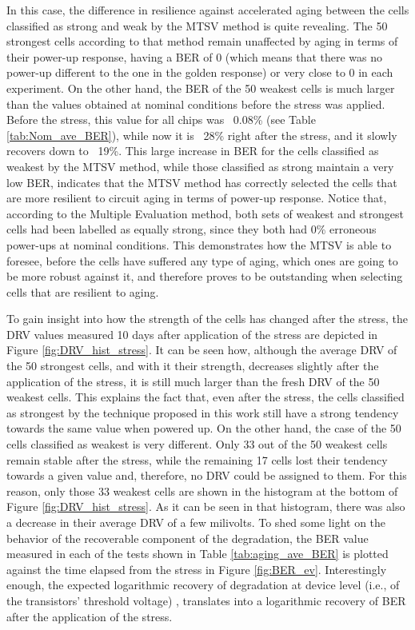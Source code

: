 In this case, the difference in resilience against accelerated aging between the cells classified as strong and weak by the MTSV method is quite revealing. The 50 strongest cells according to that method remain unaffected by aging in terms of their power-up response, having a BER of 0 (which means that there was no power-up different to the one in the golden response) or very close to 0 in each experiment. On the other hand, the BER of the 50 weakest cells is much larger than the values obtained at nominal conditions before the stress was applied. Before the stress, this value for all chips was ~0.08\% (see Table \ref{tab:Nom_ave_BER}), while now it is ~28\% right after the stress, and it slowly recovers down to ~19\%. This large increase in BER for the cells classified as weakest by the MTSV method, while those classified as strong maintain a very low BER, indicates that the MTSV method has correctly selected the cells that are more resilient to circuit aging in terms of power-up response. Notice that, according to the Multiple Evaluation method, both sets of weakest and strongest cells had been labelled as equally strong, since they both had 0\% erroneous power-ups at nominal conditions. This demonstrates how the MTSV is able to foresee, before the cells have suffered any type of aging, which ones are going to be more robust against it, and therefore proves to be outstanding when selecting cells that are resilient to aging.



To gain insight into how the strength of the cells has changed after the stress, the DRV values measured 10 days after application of the stress are depicted in Figure \ref{fig:DRV_hist_stress}. It can be seen how, although the average DRV of the 50 strongest cells, and with it their strength, decreases slightly after the application of the stress, it is still much larger than the fresh DRV of the 50 weakest cells. This explains the fact that, even after the stress, the cells classified as strongest by the technique proposed in this work still have a strong tendency towards the same value when powered up. On the other hand, the case of the 50 cells classified as weakest is very different. Only 33 out of the 50 weakest cells remain stable after the stress, while the remaining 17 cells lost their tendency towards a given value and, therefore, no DRV could be assigned to them. For this reason, only those 33 weakest cells are shown in the histogram at the bottom of Figure \ref{fig:DRV_hist_stress}. As it can be seen in that histogram, there was also a decrease in their average DRV of a few milivolts.
To shed some light on the behavior of the recoverable component of the degradation, the BER value measured in each of the tests shown in Table \ref{tab:aging_ave_BER} is plotted against the time elapsed from the stress in Figure \ref{fig:BER_ev}. Interestingly enough, the expected logarithmic recovery of degradation at device level (i.e., of the transistors’ threshold voltage) \cite{Rangan2003}, translates into a logarithmic recovery of BER after the application of the stress.


